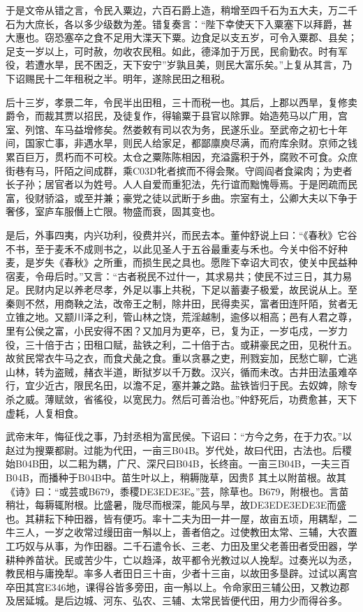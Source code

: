 \documentclass[]{article}
\begin{document}
于是文帝从错之言，令民入粟边，六百石爵上造，稍增至四千石为五大夫，万二千石为大庶长，各以多少级数为差。错复奏言：``陛下幸使天下入粟塞下以拜爵，甚大惠也。窃恐塞卒之食不足用大渫天下粟。边食足以支五岁，可令入粟郡、县矣；足支一岁以上，可时赦，勿收农民租。如此，德泽加于万民，民俞勤农。时有军役，若遭水旱，民不困乏，天下安宁''岁孰且美，则民大富乐矣。''上复从其言，乃下诏赐民十二年租税之半。明年，遂除民田之租税。

后十三岁，孝景二年，令民半出田租，三十而税一也。其后，上郡以西旱，复修卖爵令，而裁其贾以招民，及徒复作，得输粟于县官以除罪。始造苑马以广用，宫室、列馆、车马益增修矣。然娄敕有司以农为务，民遂乐业。至武帝之初七十年间，国家亡事，非遇水旱，则民人给家足，都鄙廪庾尽满，而府库余财。京师之钱累百巨万，贯朽而不可校。太仓之粟陈陈相因，充溢露积于外，腐败不可食。众庶街巷有马，阡陌之间成群，乘C03D牝者摈而不得会聚。守闾阎者食粱肉；为吏者长子孙；居官者以为姓号。人人自爱而重犯法，先行谊而黜愧辱焉。于是罔疏而民富，役财骄溢，或至并兼；豪党之徒以武断于乡曲。宗室有土，公卿大夫以下争于奢侈，室庐车服僭上亡限。物盛而衰，固其变也。

是后，外事四夷，内兴功利，役费并兴，而民去本。董仲舒说上曰：``《春秋》它谷不书，至于麦禾不成则书之，以此见圣人于五谷最重麦与禾也。今关中俗不好种麦，是岁失《春秋》之所重，而损生民之具也。愿陛下幸诏大司农，使关中民益种宿麦，令毋后时。''又言：``古者税民不过什一，其求易共；使民不过三日，其力易足。民财内足以养老尽孝，外足以事上共税，下足以蓄妻子极爱，故民说从上。至秦则不然，用商鞅之法，改帝王之制，除井田，民得卖买，富者田连阡陌，贫者无立锥之地。又颛川泽之利，管山林之饶，荒淫越制，逾侈以相高；邑有人君之尊，里有公侯之富，小民安得不困？又加月为更卒，已，复为正，一岁屯戍，一岁力役，三十倍于古；田租口赋，盐铁之利，二十倍于古。或耕豪民之田，见税什五。故贫民常衣牛马之衣，而食犬彘之食。重以贪暴之吏，刑戮妄加，民愁亡聊，亡逃山林，转为盗贼，赭衣半道，断狱岁以千万数。汉兴，循而未改。古井田法虽难卒行，宜少近古，限民名田，以澹不足，塞并兼之路。盐铁皆归于民。去奴婢，除专杀之威。薄赋敛，省徭役，以宽民力。然后可善治也。''仲舒死后，功费愈甚，天下虚耗，人复相食。

武帝末年，悔征伐之事，乃封丞相为富民侯。下诏曰：``方今之务，在于力农。''以赵过为搜粟都尉。过能为代田，一亩三B04B。岁代处，故曰代田，古法也。后稷始B04B田，以二耜为耦，广尺、深尺曰B04B，长终亩。一亩三B04B，一夫三百B04B，而播种于B04B中。苗生叶以上，稍耨陇草，因贵阝其土以附苗根。故其《诗》曰：``或芸或B679，黍稷DE3EDE3E。''芸，除草也。B679，附根也。言苗稍壮，每耨辄附根。比盛暑，陇尽而根深，能风与旱，故DE3EDE3EDE3E而盛也。其耕耘下种田器，皆有便巧。率十二夫为田一井一屋，故亩五顷，用耦犁，二牛三人，一岁之收常过缦田亩一斛以上，善者倍之。过使教田太常、三辅，大农置工巧奴与从事，为作田器。二千石遣令长、三老、力田及里父老善田者受田器，学耕种养苗状。民或苦少牛，亡以趋泽，故平都令光教过以人挽犁。过奏光以为丞，教民相与庸挽犁。率多人者田日三十亩，少者十三亩，以故田多垦辟。过试以离宫卒田其宫E346地，课得谷皆多旁田，亩一斛以上。令命家田三辅公田，又教边郡及居延城。是后边城、河东、弘农、三辅、太常民皆便代田，用力少而得谷多。
\end{document}
